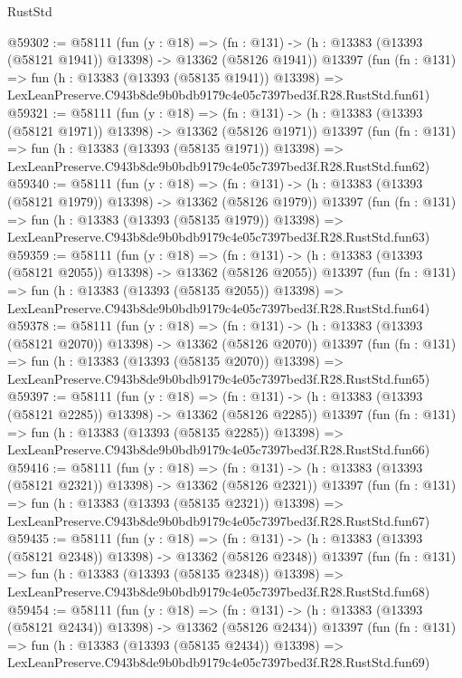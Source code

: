\begin{lexlean}{RustStd}
\begin{coremodule}
@59302 := @58111
    (fun (y : @18) =>
    (fn : @131) -> (h : @13383 (@13393 (@58121 @1941)) @13398) -> @13362 (@58126 @1941))
    @13397
    (fun (fn : @131) =>
    fun (h : @13383 (@13393 (@58135 @1941)) @13398) =>
    LexLeanPreserve.C943b8de9b0bdb9179c4e05c7397bed3f.R28.RustStd.fun61)
@59321 := @58111
    (fun (y : @18) =>
    (fn : @131) -> (h : @13383 (@13393 (@58121 @1971)) @13398) -> @13362 (@58126 @1971))
    @13397
    (fun (fn : @131) =>
    fun (h : @13383 (@13393 (@58135 @1971)) @13398) =>
    LexLeanPreserve.C943b8de9b0bdb9179c4e05c7397bed3f.R28.RustStd.fun62)
@59340 := @58111
    (fun (y : @18) =>
    (fn : @131) -> (h : @13383 (@13393 (@58121 @1979)) @13398) -> @13362 (@58126 @1979))
    @13397
    (fun (fn : @131) =>
    fun (h : @13383 (@13393 (@58135 @1979)) @13398) =>
    LexLeanPreserve.C943b8de9b0bdb9179c4e05c7397bed3f.R28.RustStd.fun63)
@59359 := @58111
    (fun (y : @18) =>
    (fn : @131) -> (h : @13383 (@13393 (@58121 @2055)) @13398) -> @13362 (@58126 @2055))
    @13397
    (fun (fn : @131) =>
    fun (h : @13383 (@13393 (@58135 @2055)) @13398) =>
    LexLeanPreserve.C943b8de9b0bdb9179c4e05c7397bed3f.R28.RustStd.fun64)
@59378 := @58111
    (fun (y : @18) =>
    (fn : @131) -> (h : @13383 (@13393 (@58121 @2070)) @13398) -> @13362 (@58126 @2070))
    @13397
    (fun (fn : @131) =>
    fun (h : @13383 (@13393 (@58135 @2070)) @13398) =>
    LexLeanPreserve.C943b8de9b0bdb9179c4e05c7397bed3f.R28.RustStd.fun65)
@59397 := @58111
    (fun (y : @18) =>
    (fn : @131) -> (h : @13383 (@13393 (@58121 @2285)) @13398) -> @13362 (@58126 @2285))
    @13397
    (fun (fn : @131) =>
    fun (h : @13383 (@13393 (@58135 @2285)) @13398) =>
    LexLeanPreserve.C943b8de9b0bdb9179c4e05c7397bed3f.R28.RustStd.fun66)
@59416 := @58111
    (fun (y : @18) =>
    (fn : @131) -> (h : @13383 (@13393 (@58121 @2321)) @13398) -> @13362 (@58126 @2321))
    @13397
    (fun (fn : @131) =>
    fun (h : @13383 (@13393 (@58135 @2321)) @13398) =>
    LexLeanPreserve.C943b8de9b0bdb9179c4e05c7397bed3f.R28.RustStd.fun67)
@59435 := @58111
    (fun (y : @18) =>
    (fn : @131) -> (h : @13383 (@13393 (@58121 @2348)) @13398) -> @13362 (@58126 @2348))
    @13397
    (fun (fn : @131) =>
    fun (h : @13383 (@13393 (@58135 @2348)) @13398) =>
    LexLeanPreserve.C943b8de9b0bdb9179c4e05c7397bed3f.R28.RustStd.fun68)
@59454 := @58111
    (fun (y : @18) =>
    (fn : @131) -> (h : @13383 (@13393 (@58121 @2434)) @13398) -> @13362 (@58126 @2434))
    @13397
    (fun (fn : @131) =>
    fun (h : @13383 (@13393 (@58135 @2434)) @13398) =>
    LexLeanPreserve.C943b8de9b0bdb9179c4e05c7397bed3f.R28.RustStd.fun69)

\end{coremodule}
\end{lexlean}
